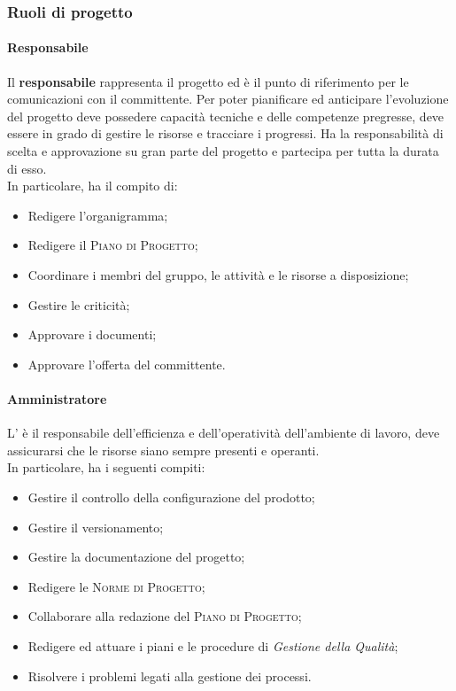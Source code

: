 \subsubsection{Ruoli di progetto}

\paragraph{Responsabile}

Il \textbf{responsabile} rappresenta il progetto ed è il punto di riferimento per le comunicazioni con il committente. 
Per poter pianificare ed anticipare l'evoluzione del progetto deve possedere capacità tecniche e delle competenze 
pregresse, deve essere in grado di gestire le risorse e tracciare i progressi. Ha la responsabilità di scelta e 
approvazione su gran parte del progetto e partecipa per tutta la durata di esso.\\
In particolare, ha il compito di:
\begin{itemize}
    \item Redigere l'organigramma;
    \item Redigere il \textsc{Piano di Progetto};
    \item Coordinare i membri del gruppo, le attività e le risorse a disposizione;
    \item Gestire le criticità;
    \item Approvare i documenti;
    \item Approvare l'offerta del committente.
\end{itemize}

\paragraph{Amministratore}

L'\textbf{} è il responsabile dell'efficienza e dell'operatività dell'ambiente di lavoro, 
deve assicurarsi che le risorse siano sempre presenti e operanti.\\
In particolare, ha i seguenti compiti:
\begin{itemize}
    \item Gestire il controllo della configurazione del prodotto;
    \item Gestire il versionamento;
    \item Gestire la documentazione del progetto;
    \item Redigere le \textsc{Norme di Progetto};
    \item Collaborare alla redazione del \textsc{Piano di Progetto};
    \item Redigere ed attuare i piani e le procedure di \emph{Gestione della Qualità};
    \item Risolvere i problemi legati alla gestione dei processi.
\end{itemize}
    
